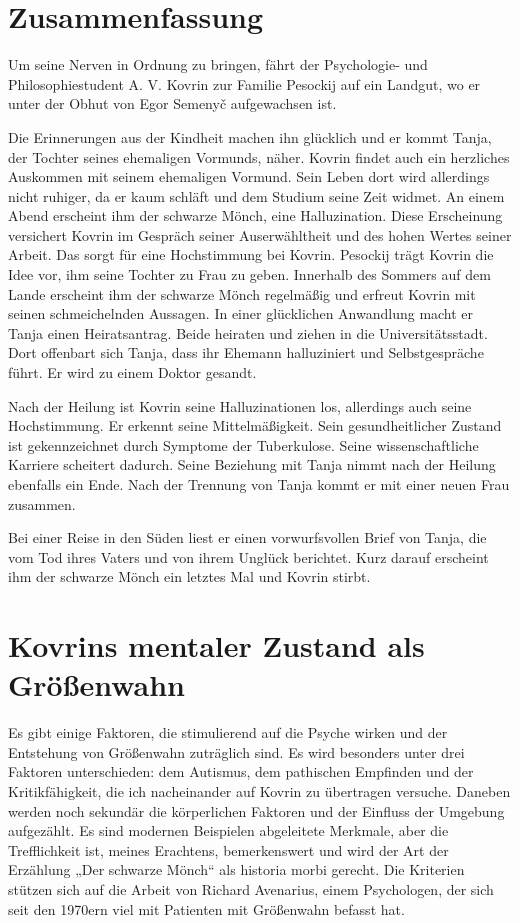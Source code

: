 \documentclass[12pt,headsepline,a4paper]{scrartcl}
\begin{document}
\section{Zusammenfassung}
Um seine Nerven in Ordnung zu bringen, fährt der Psychologie- und Philosophiestudent A.
V. Kovrin zur Familie Pesockij auf ein Landgut, wo er unter der Obhut von Egor
Semenyč aufgewachsen ist.

Die Erinnerungen aus der Kindheit machen ihn glücklich und er kommt Tanja, der Tochter
seines ehemaligen Vormunds, näher. Kovrin findet auch ein herzliches Auskommen mit seinem
ehemaligen Vormund. Sein Leben dort wird allerdings nicht ruhiger, da er kaum schläft und dem
Studium seine Zeit widmet. An einem Abend erscheint ihm der schwarze Mönch, eine
Halluzination. Diese Erscheinung versichert Kovrin im Gespräch seiner Auserwähltheit und des
hohen Wertes seiner Arbeit. Das sorgt für eine Hochstimmung bei Kovrin. Pesockij trägt Kovrin die
Idee vor, ihm seine Tochter zu Frau zu geben. Innerhalb des Sommers auf dem Lande erscheint ihm
der schwarze Mönch regelmäßig und erfreut Kovrin mit seinen schmeichelnden Aussagen. In einer
glücklichen Anwandlung macht er Tanja einen Heiratsantrag. Beide heiraten und ziehen in die
Universitätsstadt. Dort offenbart sich Tanja, dass ihr Ehemann halluziniert und Selbstgespräche
führt. Er wird zu einem Doktor gesandt.

Nach der Heilung ist Kovrin seine Halluzinationen los, allerdings auch seine Hochstimmung.
Er erkennt seine Mittelmäßigkeit. Sein gesundheitlicher Zustand ist gekennzeichnet durch
Symptome der Tuberkulose. Seine wissenschaftliche Karriere scheitert dadurch. Seine
Beziehung mit Tanja nimmt nach der Heilung ebenfalls ein Ende. Nach der Trennung von
Tanja kommt er mit einer neuen Frau zusammen.

Bei einer Reise in den Süden liest er einen vorwurfsvollen Brief von Tanja, die vom Tod ihres
Vaters und von ihrem Unglück berichtet. Kurz darauf erscheint ihm der schwarze Mönch ein letztes
Mal und Kovrin stirbt.
\section{Kovrins mentaler Zustand als Größenwahn}
Es gibt einige Faktoren, die stimulierend auf die Psyche wirken und der Entstehung von
Größenwahn zuträglich sind. Es wird besonders unter drei Faktoren unterschieden: dem Autismus,
dem pathischen Empfinden und der Kritikfähigkeit, die ich nacheinander auf Kovrin zu
übertragen versuche.  Daneben werden noch sekundär die körperlichen Faktoren und der Einfluss
der Umgebung aufgezählt. Es sind modernen Beispielen abgeleitete Merkmale, aber die
Trefflichkeit ist, meines Erachtens, bemerkenswert und wird der Art der Erzählung „Der schwarze
Mönch“ als historia morbi gerecht. Die Kriterien stützen sich auf die Arbeit von Richard Avenarius, einem
Psychologen, der sich seit den 1970ern viel mit Patienten mit Größenwahn befasst hat.
\end{document}
